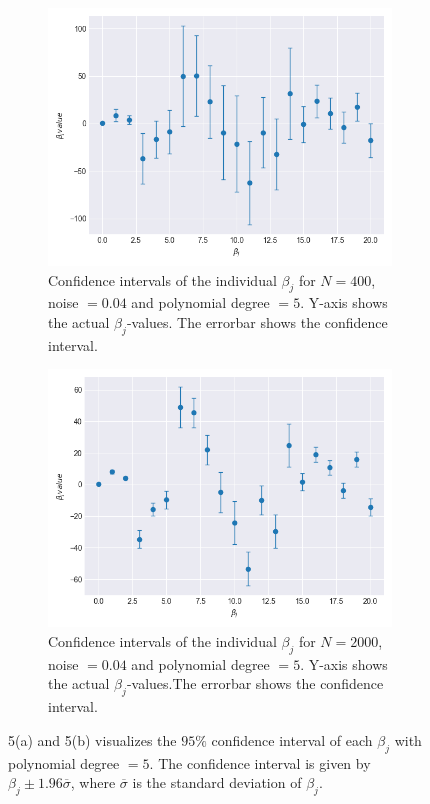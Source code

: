 \documentclass[a4paper,twocolumn]{article}
\begin{document}
\begin{figure}[ht]
    \centering
    \begin{subfigure}[b]{0.9\columnwidth}
        \includegraphics[width=\columnwidth]{conf_intervals_beta_N=400_Noise=0.04_Degree=5.png}
        \caption{Confidence intervals of the individual $\beta_{j}$ for $N = 400$, noise $= 0.04$ and polynomial degree $= 5$. Y-axis shows the actual $\beta_{j}$-values. The errorbar shows the confidence interval.}
    \end{subfigure}
    
    \begin{subfigure}[b]{0.9\columnwidth}
        \includegraphics[width=\columnwidth]{conf_intervals_beta_N=2000_Noise=0.04_Degree=5.png}
        \caption{Confidence intervals of the individual $\beta_{j}$ for $N = 2000$, noise $= 0.04$ and polynomial degree $= 5$. Y-axis shows the actual $\beta_{j}$-values.The errorbar shows the confidence interval.}
    \end{subfigure}
    \caption{5(a) and 5(b) visualizes the $95\%$ confidence interval of each $\beta_{j}$ with polynomial degree $= 5$. The confidence interval is given by $\beta_{j} \pm 1.96\overline{\sigma}$, where $\overline{\sigma}$ is the standard deviation of $\beta_{j}$.}
\end{figure}\\
\end{document}
